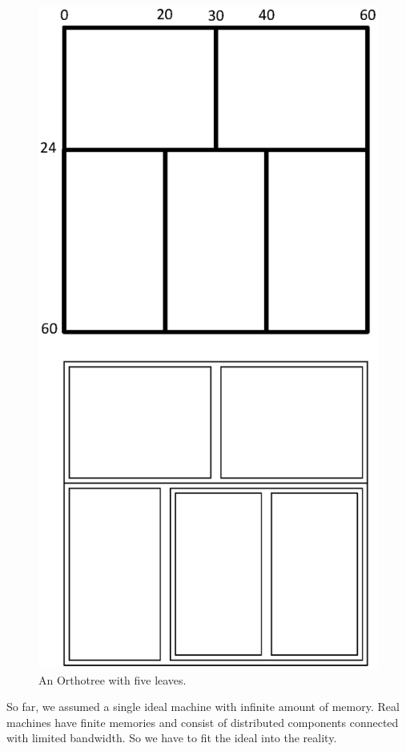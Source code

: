 \documentclass[twocolumn]{article}
\begin{document}
\begin{figure}
  \includegraphics[scale=0.5]{figure/orthotree.eps}
  \caption{An Orthotree with five leaves.}
  \label{FigureOrthotree}
\end{figure}

So far, we assumed a single ideal machine with infinite amount of memory. Real
machines have finite memories and consist of distributed components connected
with limited bandwidth.  So we have to fit the ideal into the reality.
\end{document}
